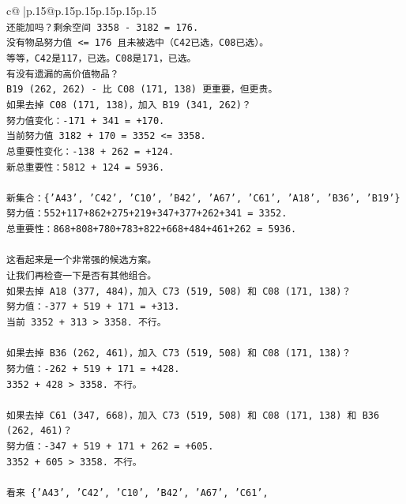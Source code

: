 \documentclass{article}
\begin{document}
{\begin{supertabular}{c@{$\;$}|p{.15\linewidth}@{}p{.15\linewidth}p{.15\linewidth}p{.15\linewidth}p{.15\linewidth}p{.15\linewidth}}
{{{\\ 
\texttt{还能加吗？剩余空间 3358 {-} 3182 = 176.} \\
\texttt{没有物品努力值 <= 176 且未被选中（C42已选，C08已选）。} \\
\texttt{等等，C42是117，已选。C08是171，已选。} \\
\texttt{有没有遗漏的高价值物品？} \\
\texttt{B19 (262, 262) {-} 比 C08 (171, 138) 更重要，但更贵。} \\
\texttt{如果去掉 C08 (171, 138)，加入 B19 (341, 262)？} \\
\texttt{努力值变化：{-}171 + 341 = +170.} \\
\texttt{当前努力值 3182 + 170 = 3352 <= 3358.} \\
\texttt{总重要性变化：{-}138 + 262 = +124.} \\
\texttt{新总重要性：5812 + 124 = 5936.} \\
\\ 
\texttt{新集合：\{'A43', 'C42', 'C10', 'B42', 'A67', 'C61', 'A18', 'B36', 'B19'\}} \\
\texttt{努力值：552+117+862+275+219+347+377+262+341 = 3352.} \\
\texttt{总重要性：868+808+780+783+822+668+484+461+262 = 5936.} \\
\\ 
\texttt{这看起来是一个非常强的候选方案。} \\
\texttt{让我们再检查一下是否有其他组合。} \\
\texttt{如果去掉 A18 (377, 484)，加入 C73 (519, 508) 和 C08 (171, 138)？} \\
\texttt{努力值：{-}377 + 519 + 171 = +313.} \\
\texttt{当前 3352 + 313 > 3358. 不行。} \\
\\ 
\texttt{如果去掉 B36 (262, 461)，加入 C73 (519, 508) 和 C08 (171, 138)？} \\
\texttt{努力值：{-}262 + 519 + 171 = +428.} \\
\texttt{3352 + 428 > 3358. 不行。} \\
\\ 
\texttt{如果去掉 C61 (347, 668)，加入 C73 (519, 508) 和 C08 (171, 138) 和 B36 (262, 461)？} \\
\texttt{努力值：{-}347 + 519 + 171 + 262 = +605.} \\
\texttt{3352 + 605 > 3358. 不行。} \\
\\ 
\texttt{看来 \{'A43', 'C42', 'C10', 'B42', 'A67', 'C61',} \\
            }
        }
    }
     \\ \\


\end{supertabular}}
\end{document}
